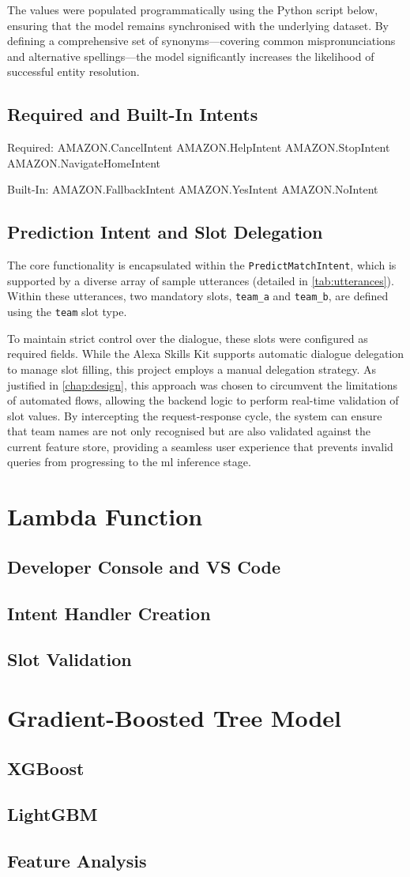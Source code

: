 The values were populated programmatically using the Python script below, ensuring that the model remains synchronised with the underlying dataset. By defining a comprehensive set of synonyms—covering common mispronunciations and alternative spellings—the model significantly increases the likelihood of successful entity resolution.

\subsection{Required and Built-In Intents}
Required:
AMAZON.CancelIntent
AMAZON.HelpIntent
AMAZON.StopIntent
AMAZON.NavigateHomeIntent

Built-In:
AMAZON.FallbackIntent
AMAZON.YesIntent
AMAZON.NoIntent

\subsection{Prediction Intent and Slot Delegation}
The core functionality is encapsulated within the \texttt{PredictMatchIntent}, which is supported by a diverse array of sample utterances (detailed in \autoref{tab:utterances}). Within these utterances, two mandatory slots, \texttt{team\_a} and \texttt{team\_b}, are defined using the \texttt{team} slot type.

To maintain strict control over the dialogue, these slots were configured as required fields. While the Alexa Skills Kit supports automatic dialogue delegation to manage slot filling, this project employs a manual delegation strategy. As justified in \autoref{chap:design}, this approach was chosen to circumvent the limitations of automated flows, allowing the backend logic to perform real-time validation of slot values. By intercepting the request-response cycle, the system can ensure that team names are not only recognised but are also validated against the current feature store, providing a seamless user experience that prevents invalid queries from progressing to the \gls{ml} inference stage.

\section{Lambda Function}
\subsection{Developer Console and VS Code}
\subsection{Intent Handler Creation}
\subsection{Slot Validation}

\section{Gradient-Boosted Tree Model}
\subsection{XGBoost}
\subsection{LightGBM}
\subsection{Feature Analysis}